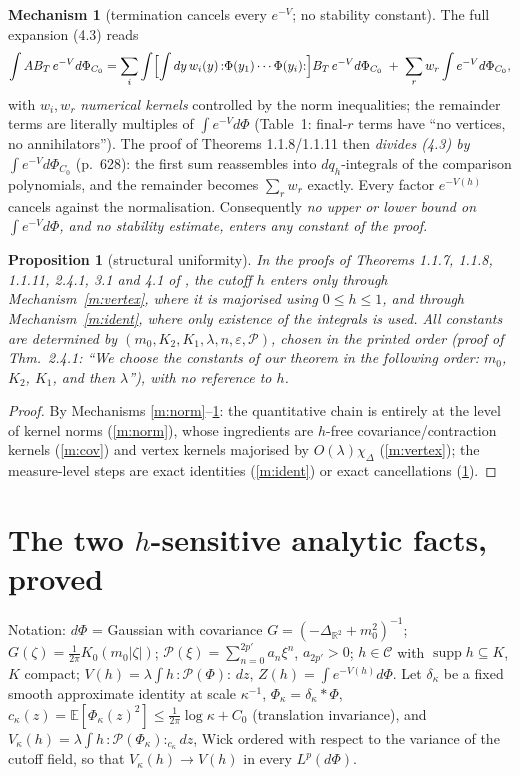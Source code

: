 \documentclass[11pt,a4paper]{article}
\theoremstyle{plain}
\newtheorem{proposition}[theorem]{Proposition}
\theoremstyle{definition}
\newtheorem{mechanism}[theorem]{Mechanism}
\newcommand{\R}{\mathbb{R}}
\newcommand{\E}{\mathbb{E}}
\DeclareMathOperator{\supp}{supp}
\begin{document}
\begin{mechanism}[termination cancels every $e^{-V}$; no stability constant]\label{m:cancel}
The full expansion (4.3) reads
\[
  \int AB_T\,e^{-V}d\Phi_{C_0}
  =\sum_i\int\Bigl[\int dy\,w_i(y)\,{:}\Phi(y_1)\cdots\Phi(y_i){:}\Bigr]B_T\,e^{-V}d\Phi_{C_0}
  \;+\;\sum_r w_r\int e^{-V}d\Phi_{C_0},
\]
with $w_i,w_r$ \emph{numerical kernels} controlled by the norm inequalities; the remainder
terms are literally multiples of $\int e^{-V}d\Phi$ (Table~1: final-$r$ terms have ``no vertices,
no annihilators''). The proof of Theorems 1.1.8/1.1.11 then \emph{divides (4.3) by
$\int e^{-V}d\Phi_{C_0}$} (p.~628): the first sum reassembles into $dq_h$-integrals of the
comparison polynomials, and the remainder becomes $\sum_rw_r$ exactly. Every factor $e^{-V(h)}$
cancels against the normalisation. Consequently \emph{no upper or lower bound on
$\int e^{-V}d\Phi$, and no stability estimate, enters any constant of the proof}.
\end{mechanism}

\begin{proposition}[structural uniformity]\label{prop:struct}
In the proofs of Theorems 1.1.7, 1.1.8, 1.1.11, 2.4.1, 3.1 and 4.1 of \cite{GJS}, the cutoff $h$
enters only through Mechanism~\ref{m:vertex}, where it is majorised using $0\le h\le1$, and
through Mechanism~\ref{m:ident}, where only existence of the integrals is used. All constants
are determined by $(m_0,K_2,K_1,\lambda,n,\varepsilon,\mathscr P)$, chosen in the printed order
(proof of Thm.~2.4.1: ``We choose the constants of our theorem in the following order: $m_0$,
$K_2$, $K_1$, and then $\lambda$''), with no reference to $h$.
\end{proposition}

\begin{proof}
By Mechanisms \ref{m:norm}--\ref{m:cancel}: the quantitative chain is entirely at the level of
kernel norms (\ref{m:norm}), whose ingredients are $h$-free covariance/contraction kernels
(\ref{m:cov}) and vertex kernels majorised by $O(\lambda)\chi_\Delta$ (\ref{m:vertex}); the
measure-level steps are exact identities (\ref{m:ident}) or exact cancellations (\ref{m:cancel}).
\end{proof}

\section{The two $h$-sensitive analytic facts, proved}\label{sec:analytic}

Notation: $d\Phi$ = Gaussian with covariance $G=(-\Delta_{\R^2}+m_0^2)^{-1}$;
$G(\zeta)=\frac1{2\pi}K_0(m_0|\zeta|)$; $\mathscr P(\xi)=\sum_{n=0}^{2p'}a_n\xi^n$,
$a_{2p'}>0$; $h\in\mathcal C$ with $\supp h\subseteq K$, $K$ compact;
$V(h)=\lambda\int h\,{:}\mathscr P(\Phi){:}\,dz$, $Z(h)=\int e^{-V(h)}d\Phi$. Let
$\delta_\kappa$ be a fixed smooth approximate identity at scale $\kappa^{-1}$,
$\Phi_\kappa=\delta_\kappa*\Phi$, $c_\kappa(z)=\E[\Phi_\kappa(z)^2]\le\frac1{2\pi}\log\kappa+C_0$
(translation invariance), and
$V_\kappa(h)=\lambda\int h\,{:}\mathscr P(\Phi_\kappa){:}_{c_\kappa}dz$, Wick ordered with
respect to the variance of the cutoff field, so that $V_\kappa(h)\to V(h)$ in every
$L^p(d\Phi)$.
\end{document}
